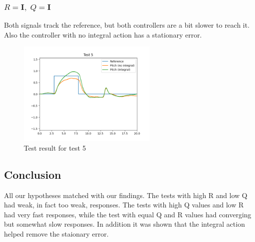 \subsubsection{$R = \mathbf{I},\; Q=\mathbf{I}$}
Both signals track the reference, but both controllers are a bit slower to reach it. Also the controller with no integral action has a stationary error.
\begin{figure}[H]
	\centering
	\includegraphics[width=0.6\textwidth]{figures/lab2-test5.png}
	\caption{Test result for test 5}
	\label{}
\end{figure}

\subsection{Conclusion}
All our hypotheses matched with our findings. The tests with high R and low Q had weak, in fact too weak, responses. The tests with high Q values and low R had very fast responses, while the test with equal Q and R values had converging but somewhat slow responses. In addition it was shown that the integral action helped remove the staionary error.